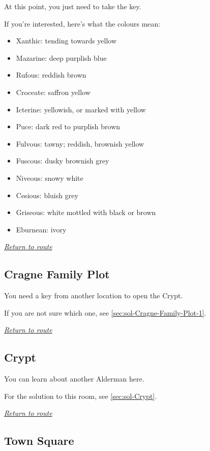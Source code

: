 \documentclass[a5paper]{extarticle}
\begin{document}
At this point, you just need to take the key.

If you're interested, here's what the colours mean:

\begin{itemize}
\item Xanthic: tending towards yellow
\item Mazarine: deep purplish blue
\item Rufous: reddish brown
\item Croceate: saffron yellow
\item Icterine: yellowish, or marked with yellow
\item Puce: dark red to purplish brown
\item Fulvous: tawny; reddish, brownish yellow
\item Fuscous: dusky brownish grey
\item Niveous: snowy white
\item Cesious:  bluish grey
\item Griseous: white mottled with black or brown
\item Eburnean: ivory
\end{itemize}

\hyperref[sec:route-6]{\emph{Return to route}}

\newpage
\subsection{Cragne Family Plot}\label{sec:req-Cragne-Family-Plot-1}

You need a key from another location to open the Crypt.

If you are not sure which one, see \cref{sec:sol-Cragne-Family-Plot-1}.

\hyperref[sec:route-6]{\emph{Return to route}}

\newpage
\subsection{Crypt}\label{sec:req-Crypt}

You can learn about another Alderman here.

For the solution to this room, see \cref{sec:sol-Crypt}.

\hyperref[sec:route-6]{\emph{Return to route}}

\newpage
\subsection{Town Square}\label{sec:req-Town-Square}
\end{document}

